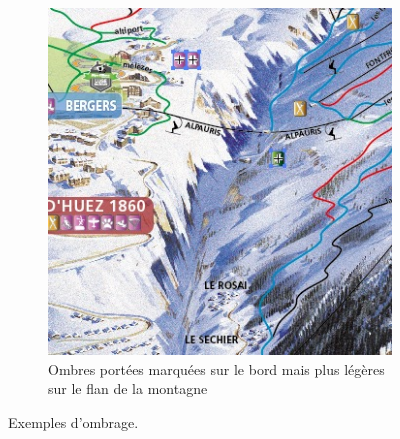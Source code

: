 \begin{figure}[!h]
\begin{subfigure}[t]{0.47\textwidth}
 \includegraphics[width=1.0\linewidth]{novat/ombres_zoom.jpg}
 \caption{\label{fig:OmbrePortées} Ombres portées marquées sur le bord mais plus légères sur le flan de la montagne}
 \end{subfigure}
 \caption{\label{fig:ExOmbres} Exemples d'ombrage. %
 }
\end{figure}


